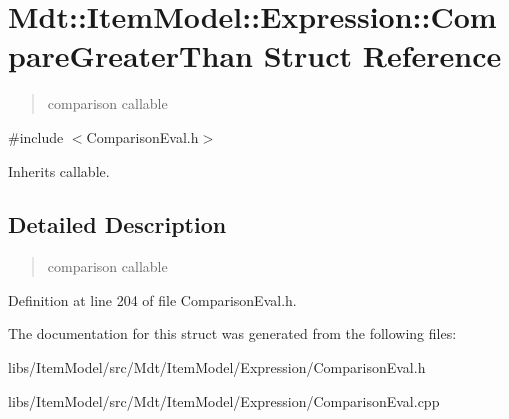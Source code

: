 \hypertarget{struct_mdt_1_1_item_model_1_1_expression_1_1_compare_greater_than}{}\section{Mdt\+:\+:Item\+Model\+:\+:Expression\+:\+:Compare\+Greater\+Than Struct Reference}
\label{struct_mdt_1_1_item_model_1_1_expression_1_1_compare_greater_than}


\begin{quote}
comparison callable \end{quote}
 




{\ttfamily \#include $<$Comparison\+Eval.\+h$>$}



Inherits callable.



\subsection{Detailed Description}
\begin{quote}
comparison callable \end{quote}


Definition at line 204 of file Comparison\+Eval.\+h.



The documentation for this struct was generated from the following files\+:\begin{DoxyCompactItemize}
\item 
libs/\+Item\+Model/src/\+Mdt/\+Item\+Model/\+Expression/Comparison\+Eval.\+h\item 
libs/\+Item\+Model/src/\+Mdt/\+Item\+Model/\+Expression/Comparison\+Eval.\+cpp\end{DoxyCompactItemize}
